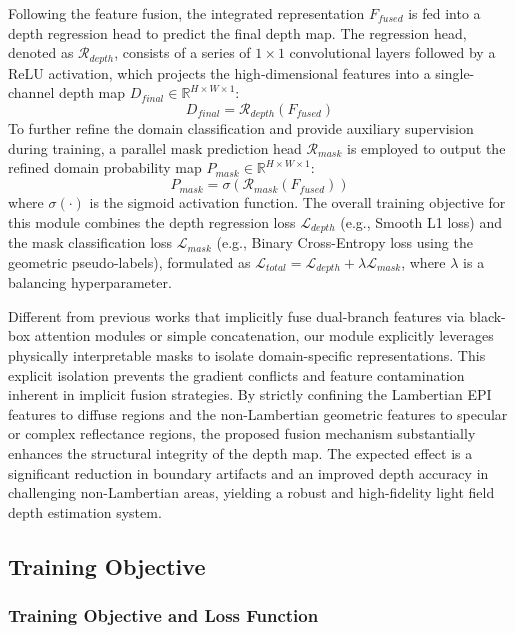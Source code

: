 \documentclass[lettersize,journal]{IEEEtran}
\begin{document}
Following the feature fusion, the integrated representation $F_{fused}$ is fed into a depth regression head to predict the final depth map. The regression head, denoted as $\mathcal{R}_{depth}$, consists of a series of $1 \times 1$ convolutional layers followed by a ReLU activation, which projects the high-dimensional features into a single-channel depth map $D_{final} \in \mathbb{R}^{H \times W \times 1}$:
\begin{equation}
D_{final} = \mathcal{R}_{depth}(F_{fused})
\end{equation}
To further refine the domain classification and provide auxiliary supervision during training, a parallel mask prediction head $\mathcal{R}_{mask}$ is employed to output the refined domain probability map $P_{mask} \in \mathbb{R}^{H \times W \times 1}$:
\begin{equation}
P_{mask} = \sigma(\mathcal{R}_{mask}(F_{fused}))
\end{equation}
where $\sigma(\cdot)$ is the sigmoid activation function. The overall training objective for this module combines the depth regression loss $\mathcal{L}_{depth}$ (e.g., Smooth L1 loss) and the mask classification loss $\mathcal{L}_{mask}$ (e.g., Binary Cross-Entropy loss using the geometric pseudo-labels), formulated as $\mathcal{L}_{total} = \mathcal{L}_{depth} + \lambda \mathcal{L}_{mask}$, where $\lambda$ is a balancing hyperparameter.

Different from previous works that implicitly fuse dual-branch features via black-box attention modules or simple concatenation, our module explicitly leverages physically interpretable masks to isolate domain-specific representations. This explicit isolation prevents the gradient conflicts and feature contamination inherent in implicit fusion strategies. By strictly confining the Lambertian EPI features to diffuse regions and the non-Lambertian geometric features to specular or complex reflectance regions, the proposed fusion mechanism substantially enhances the structural integrity of the depth map. The expected effect is a significant reduction in boundary artifacts and an improved depth accuracy in challenging non-Lambertian areas, yielding a robust and high-fidelity light field depth estimation system.

\subsection{Training Objective}

\subsubsection{Training Objective and Loss Function}
\end{document}
